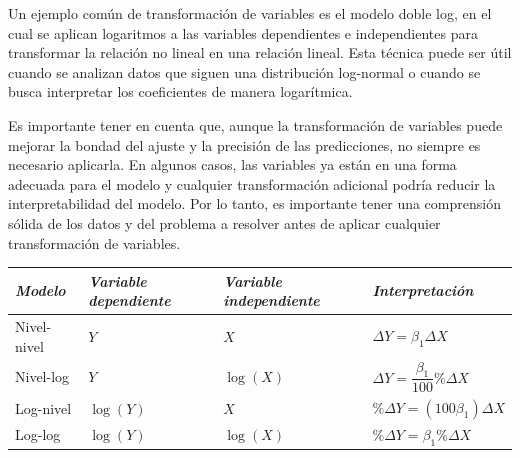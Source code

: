 \documentclass[
]{book}
\newcounter{none} %
\begin{document}
Un ejemplo común de transformación de variables es el modelo doble log,
en el cual se aplican logaritmos a las variables dependientes e
independientes para transformar la relación no lineal en una relación
lineal. Esta técnica puede ser útil cuando se analizan datos que siguen
una distribución log-normal o cuando se busca interpretar los
coeficientes de manera logarítmica.

Es importante tener en cuenta que, aunque la transformación de variables
puede mejorar la bondad del ajuste y la precisión de las predicciones,
no siempre es necesario aplicarla. En algunos casos, las variables ya
están en una forma adecuada para el modelo y cualquier transformación
adicional podría reducir la interpretabilidad del modelo. Por lo tanto,
es importante tener una comprensión sólida de los datos y del problema a
resolver antes de aplicar cualquier transformación de variables.

{\def\LTcaptype{none} %
\begin{longtable}[]{@{}
  >{\raggedright\arraybackslash}p{}
  >{\raggedright\arraybackslash}p{}
  >{\raggedright\arraybackslash}p{}
  >{\raggedright\arraybackslash}p{}@{}}
\toprule\noalign{}
\begin{minipage}[b]{\linewidth}\raggedright
\emph{Modelo}
\end{minipage} & \begin{minipage}[b]{\linewidth}\raggedright
\emph{Variable dependiente}
\end{minipage} & \begin{minipage}[b]{\linewidth}\raggedright
\emph{Variable independiente}
\end{minipage} & \begin{minipage}[b]{\linewidth}\raggedright
\emph{Interpretación}
\end{minipage} \\
\midrule\noalign{}
\endhead
\bottomrule\noalign{}
\endlastfoot
Nivel-nivel & \(Y\) & \(X\) & \(\Delta Y = \beta_1 \Delta X\) \\
Nivel-log & \(Y\) & \(\log(X)\) & \(\Delta Y = \dfrac{\beta_1}{100}\% \Delta X\) \\
Log-nivel & \(\log(Y)\) & \(X\) & \(\%\Delta Y = (100\beta_1)\Delta X\) \\
Log-log & \(\log(Y)\) & \(\log(X)\) & \(\%\Delta Y = \beta_1 \%\Delta X\) \\
\end{longtable}
}
\end{document}
